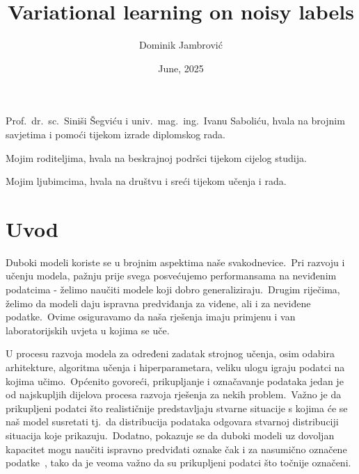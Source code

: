\documentclass[diplomskirad]{fer}
\title{Variational learning on noisy labels}
\author{Dominik Jambrović}
\date{June, 2025}
\begin{document}
\maketitle






\begin{zahvale}
  Prof.\ dr.\ sc.\ Siniši Šegviću i univ.\ mag.\ ing.\ Ivanu Saboliću, hvala na brojnim savjetima i pomoći tijekom izrade diplomskog rada.\ 
    
  Mojim roditeljima, hvala na beskrajnoj podršci tijekom cijelog studija.\ 
    
  Mojim ljubimcima, hvala na društvu i sreći tijekom učenja i rada.\ 
\end{zahvale}


\mainmatter


\tableofcontents


\chapter{Uvod}
\label{pog:uvod}
  
Duboki modeli koriste se u brojnim aspektima naše svakodnevice.\ Pri razvoju i učenju modela, pažnju prije svega posvećujemo performansama na neviđenim podatcima - želimo naučiti modele koji dobro generaliziraju.\ 
Drugim riječima, želimo da modeli daju ispravna predviđanja za viđene, ali i za neviđene podatke.\ Ovime osiguravamo da naša rješenja imaju primjenu i van laboratorijskih uvjeta u kojima se uče.\
  
U procesu razvoja modela za određeni zadatak strojnog učenja, osim odabira arhitekture, algoritma učenja i hiperparametara, veliku ulogu igraju podatci na kojima učimo.\ 
Općenito govoreći, prikupljanje i označavanje podataka jedan je od najskupljih dijelova procesa razvoja rješenja za nekih problem.\ 
Važno je da prikupljeni podatci što realističnije predstavljaju stvarne situacije s kojima će se naš model susretati tj.\ da distribucija podataka odgovara stvarnoj distribuciji situacija koje prikazuju.\ 
Dodatno, pokazuje se da duboki modeli uz dovoljan kapacitet mogu naučiti ispravno predviđati oznake čak i za nasumično označene podatke~\cite{zhang2016understanding}, tako da je veoma važno da su prikupljeni podatci što točnije označeni.\
  
\end{document}

